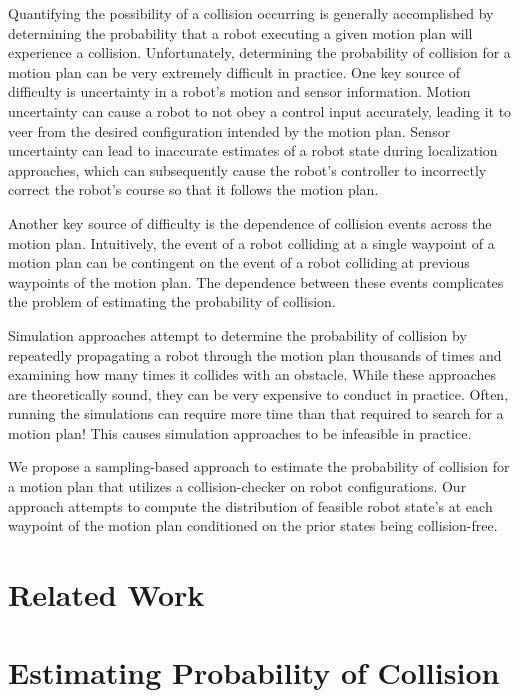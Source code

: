 \documentclass[journal]{IEEEtran}
\begin{document}
Quantifying the possibility of a collision occurring is generally accomplished by determining the probability that a robot executing a given motion plan will experience a collision. Unfortunately, determining the probability of collision for a motion plan can be very extremely difficult in practice. One key source of difficulty is uncertainty in a robot's motion and sensor information. Motion uncertainty can cause a robot to not obey a control input accurately, leading it to veer from the desired configuration intended by the motion plan. Sensor uncertainty can lead to inaccurate estimates of a robot state during localization approaches, which can subsequently cause the robot's controller to incorrectly correct the robot's course so that it follows the motion plan.

Another key source of difficulty is the dependence of collision events across the motion plan. Intuitively, the event of a robot colliding at a single waypoint of a motion plan can be contingent on the event of a robot colliding at previous waypoints of the motion plan. The dependence between these events complicates the problem of estimating the probability of collision.

Simulation approaches attempt to determine the probability of collision by repeatedly propagating a robot through the motion plan thousands of times and examining how many times it collides with an obstacle. While these approaches are theoretically sound, they can be very expensive to conduct in practice. Often, running the simulations can require more time than that required to search for a motion plan! This causes simulation approaches to be infeasible in practice.

We propose a sampling-based approach to estimate the probability of collision for a motion plan that utilizes a collision-checker on robot configurations. Our approach attempts to compute the distribution of feasible robot state's at each waypoint of the motion plan conditioned on the prior states being collision-free.

\section{Related Work}



\section{Estimating Probability of Collision}
\end{document}
